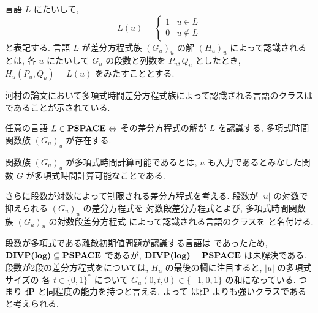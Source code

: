  言語 $L$ にたいして, 
 \begin{equation}
	L(u) = \begin{cases} 
	       1 & u \in L \\
	       0 & u \not \in L 
	       \end{cases}
 \end{equation}
 と表記する.
 言語 $L$ が差分方程式族 $(G_u)_u$ の解 $(H_u)_u$ によって認識されるとは,
 各 $u$ にたいして $G_u$ の段数と列数を $P_u, Q_u$ としたとき,
 $H_u(P_u, Q_u) = L(u)$ をみたすこととする.



 河村の論文において多項式時間差分方程式族によって認識される言語のクラスは
 \PSPACE であることが示されている.

 \begin{lemma}
  \label{WeakFeedback}
  任意の言語 $L \in  {\bf PSPACE} \Leftrightarrow$
  その差分方程式の解が $L$ を認識する,
  多項式時間関数族 $(G_u)_u$ が存在する.
 \end{lemma}

 関数族 $(G_u)_u$ が多項式時間計算可能であるとは,
 $u$ も入力であるとみなした関数 $G$ が多項式時間計算可能なことである.



 さらに段数が対数によって制限される差分方程式を考える.
 段数が $|u|$ の対数で抑えられる $(G_u)_u$ の差分方程式を
 対数段差分方程式とよび, 多項式時間関数族 $(G_u)_u$ の対数段差分方程式
 によって認識される言語のクラスを \DIVPlog と名付ける.
 
 段数が多項式である離散初期値問題が認識する言語は \PSPACE であったため,
 $\text{\bf DIVP(log)} \subseteq {\bf PSPACE}$ であるが, $\text{\bf DIVP(log)} = {\bf PSPACE}$ は未解決である.
 段数が2段の差分方程式をについては,
 $H_u$ の最後の欄に注目すると,
 $|u|$ の多項式サイズの 各 $t \in \{0,1\}^*$ について
 $G_u(0, t, 0) \in \{-1, 0, 1\}$ の和になっている.
 つまり $\sharp${\bf P} と同程度の能力を持つと言える.
 よって \DIVPlog は$\sharp${\bf P} よりも強いクラスであると考えられる.

